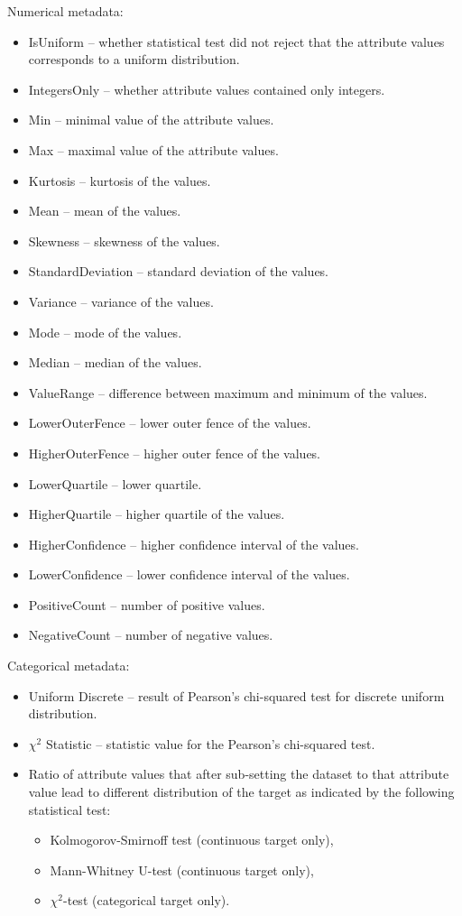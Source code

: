 Numerical metadata:
\begin{itemize}	
	\item IsUniform -- whether statistical test did not reject that the attribute values corresponds to a uniform distribution.   
	\item IntegersOnly -- whether attribute values contained only integers.    
	\item Min -- minimal value of the attribute values.
	\item Max  -- maximal value of the attribute values.
	\item Kurtosis -- kurtosis of the values.
	\item Mean -- mean of the values.
	\item Skewness -- skewness of the values.
	\item StandardDeviation -- standard deviation of the values.
	\item Variance -- variance of the values.   
	\item Mode -- mode of the values.   
	\item Median -- median of the values.  
	\item ValueRange -- difference between maximum and minimum of the values.  
	\item LowerOuterFence -- lower outer fence of the values.  
	\item HigherOuterFence -- higher outer fence of the values.  
	\item LowerQuartile  -- lower quartile.  
	\item HigherQuartile -- higher quartile of the values.   
	\item HigherConfidence -- higher confidence interval of the values.  
	\item LowerConfidence -- lower confidence interval of the values.      
	\item PositiveCount -- number of positive values.   
	\item NegativeCount -- number of negative values.   
	
\end{itemize}

Categorical metadata:

\begin{itemize}	
	\item Uniform Discrete -- result of Pearson's chi-squared test for discrete uniform distribution.
	\item $\chi^2$ Statistic  -- statistic value for the Pearson's chi-squared test.
	\item Ratio of attribute values that after sub-setting the dataset to that attribute value lead to different distribution of the target as indicated by the following statistical test:
	\begin{itemize}
		\item Kolmogorov-Smirnoff test (continuous target only),
		\item Mann-Whitney U-test (continuous target only),
		\item $\chi^2$-test (categorical target only).
	\end{itemize}
\end{itemize}

